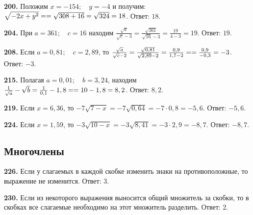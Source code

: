 \textbf{200.} Положим $x=-154;\quad y=-4$ и получим: 
$\sqrt{-2x+y^2}=\linebreak=\sqrt{308+16}=\sqrt{324}=18$. \newline \null \hspace*{\fill} Ответ: $18$. 

\textbf{204.} При $a=361;\quad c=16$ находим $\frac{\sqrt{a}}{\sqrt{c}-3}=\frac{\sqrt{361}}{\sqrt{16}-3}=\frac{19}{4-3}=19$. \newline \null \hspace*{\fill} Ответ: $19$. 

\textbf{208.} Если $a=0,81;\quad c=2,89$, то $\frac{\sqrt{a}}{\sqrt{c}-2}=\frac{\sqrt{0,81}}{\sqrt{2,89}-2}=\frac{0,9}{1,7-2}=\linebreak=\frac{0,9}{-0,3}=-3$. \newline \null \hspace*{\fill} Ответ: $-3$. 

\textbf{215.} Полагая $a=0,01;\quad b=3,24$, находим $\frac{1}{\sqrt{a}}-\sqrt{b}=\frac{1}{0,1}-1,8=\linebreak=10-1,8=8,2$. \newline \null \hspace*{\fill} Ответ: $8,2$.  

\textbf{219.} Если  $x=6,36$, то $-7\sqrt{7-x}=-7\sqrt{0,64}=-7\cdot0,8=-5,6$.\newline \null \hspace*{\fill} Ответ: $-5,6$. 

\textbf{224.} Если $x=1,59$, то $-3\sqrt{10-x}=-3\sqrt{8,41}=-3\cdot2,9=-8,7$. \newline \null \hspace*{\fill} Ответ: $-8,7$. 

\subsection{Многочлены}


\textbf{226.} Если у слагаемых в каждой  скобке  изменить знаки на противоположные,  то выражение не изменится. \newline \null \hspace*{\fill} Ответ: $3$. 

\textbf{230.} Если из некоторого выражения выносится общий множитель за скобки, то в скобках все слагаемые необходимо на этот множитель разделить. \newline \null \hspace*{\fill} Ответ: $2$. 

